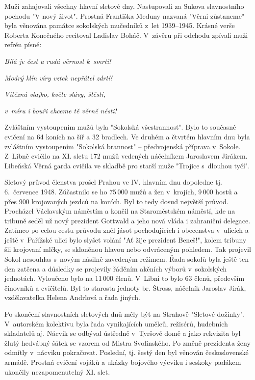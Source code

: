 \documentclass[a5paper, 11pt, twoside]{article}
\begin{document}
Muži zahajovali všechny hlavní sletové dny. Nastupovali za Sukova
slavnostního pochodu "V nový život". Prostná Františka Meduny nazvaná
"Věrni zůstaneme" byla věnována památce sokolských mučedníků z~let
1939--1945. Krásné verše Roberta Konečného recitoval Ladislav
Boháč. V~závěru při odchodu zpívali muži refrén písně:

\begin{center}
  
\textit{Bílá je čest a rudá věrnost k~smrti!}

\textit{Modrý klín víry vztek nepřátel zdrtí!}

\textit{Vítězná vlajko, květe slávy, štěstí,}

\textit{v~míru i bouři chceme tě věrně nésti!}
\end{center}

Zvláštním vystoupením mužů byla "Sokolská všestrannost". Bylo to
současné cvičení na 64 koních na šíř a 32 bradlech. Ve druhém a čtvrtém
hlavním dnu byla zvláštním vystoupením "Sokolská brannost" --
předvojenská příprava v~Sokole. Z~Libně cvičilo na XI. sletu 172 mužů
vedených náčelníkem Jaroslavem Jirákem. Libeňská Věrná garda cvičila ve
skladbě pro starší muže "Trojice s~dlouhou tyčí".

Sletový průvod členstva prošel Prahou ve IV. hlavním dnu dopoledne tj.
6.~července 1948. Zúčastnilo se ho 75\,000 mužů a žen v~krojích, 9\,000
hostů a přes 900 krojovaných jezdců na koních. Byl to tedy dosud
největší průvod. Procházel Václavským náměstím a končil na Staroměstském
náměstí, kde na tribuně seděl už nový prezident Gottwald a jeho nová
vláda i zahraniční delegace. Zatímco po celou cestu průvodu zněl jásot
pochodujících i obecenstva v~ulicích a ještě v~Pařížské ulici bylo
slyšet volání "Ať žije prezident Beneš!", kolem tribuny šli krojovaní
mlčky, se skloněnou hlavou nebo odvráceným pohledem. Tak projevil Sokol
nesouhlas s~novým násilně zavedeným režimem. Řada sokolů byla ještě ten
den zatčena a důsledky se projevily řáděním akčních výborů v~sokolských
jednotách. Vyloučeno bylo na 11\,000 členů. V~Libni to bylo 63 členů,
především činovníků a cvičitelů. Byl to starosta jednoty br. Štross,
náčelník Jaroslav Jirák, vzdělavatelka Helena Andrlová a řada jiných.

Po skončení slavnostních sletových dnů měly být na Strahově "Sletové
dožínky". V~autorském kolektivu byla řada vynikajících umělců,
režisérů, hudebních skladatelů aj. Nácvik se odbýval ústředně v~Tyršově
domě a jako rekvizita byl žlutý hedvábný šátek se vzorem od Mistra
Svolinského. Po změně prezidenta ženy odmítly v~nácviku pokračovat.
Poslední, tj. šestý den byl věnován československé armádě. Prostná
cvičení vojáků a ukázky bojového výcviku i seskoky padákem ukončily
nezapomenutelný XI. slet.
\end{document}
